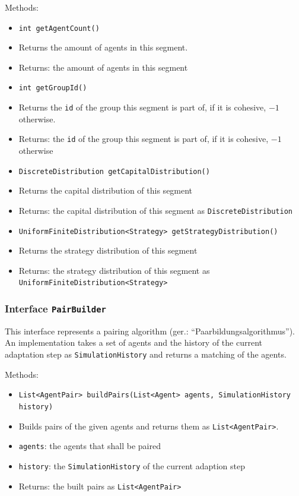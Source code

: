 \documentclass[parskip=full,11pt]{scrartcl}
\begin{document}
Methods:
\begin{itemize}\itemsep -10pt
\item \texttt{int getAgentCount()}
\item[] Returns the amount of agents in this segment.
\item[] Returns: the amount of agents in this segment

\item \texttt{int getGroupId()}
\item[] Returns the \texttt{id} of the group this segment is part of, if it is cohesive, \(-1\) otherwise.
\item[] Returns: the \texttt{id} of the group this segment is part of, if it is cohesive, \(-1\) otherwise

\item \texttt{DiscreteDistribution getCapitalDistribution()}
\item[] Returns the capital distribution of this segment
\item[] Returns: the capital distribution of this segment as \texttt{DiscreteDistribution}

\item \texttt{UniformFiniteDistribution<Strategy> getStrategyDistribution()}
\item[] Returns the strategy distribution of this segment
\item[] Returns: the strategy distribution of this segment as \texttt{UniformFiniteDistribution<Strategy>}
\end{itemize}

\subsubsection{Interface \texttt{PairBuilder}}
This interface represents a pairing algorithm (ger.: \enquote{Paarbildungsalgorithmus}). An implementation takes a set of agents and the history of the current adaptation step as \texttt{SimulationHistory} and returns a matching of the agents.

Methods:
\begin{itemize}\itemsep -10pt
\item \texttt{List<AgentPair> buildPairs(List<Agent> agents, SimulationHistory history)}
\item[] Builds pairs of the given agents and returns them as \texttt{List<AgentPair>}.
\item[] \texttt{agents}: the agents that shall be paired
\item[] \texttt{history}: the \texttt{SimulationHistory} of the current adaption step
\item[] Returns: the built pairs as \texttt{List<AgentPair>}
\end{itemize}
\end{document}
